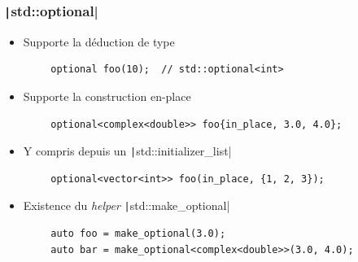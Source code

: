 \documentclass[C++.tex]{subfiles}
\begin{document}
\begin{frame}[fragile]
	\frametitle{\texttt|std::optional|}
	\begin{itemize}
		\item Supporte la déduction de type
	\end{itemize}

	\begin{verbatim}
		optional foo(10);  // std::optional<int>
	\end{verbatim}

	\begin{itemize}
		\item Supporte la construction en-place
	\end{itemize}

	\begin{verbatim}
		optional<complex<double>> foo{in_place, 3.0, 4.0};
	\end{verbatim}

	\begin{itemize}
		\item Y compris depuis un \texttt|std::initializer_list|
	\end{itemize}

	\begin{verbatim}
		optional<vector<int>> foo(in_place, {1, 2, 3});
	\end{verbatim}

	\begin{itemize}
		\item Existence du \textit{helper} \texttt|std::make_optional|
	\end{itemize}

	\begin{verbatim}
		auto foo = make_optional(3.0);
		auto bar = make_optional<complex<double>>(3.0, 4.0);
	\end{verbatim}
\end{frame}
\end{document}
